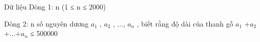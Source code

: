 Dữ liệu
Dòng 1: n (1 ≤ n ≤ 2000)

Dòng 2: n số nguyên dương $a_{1}$ , $a_{2}$ , ..., $a_{n}$ , biết rằng độ dài của thanh gỗ $a_{1}$ +$a_{2}$ +...+$a_{n}$ ≤ 500000